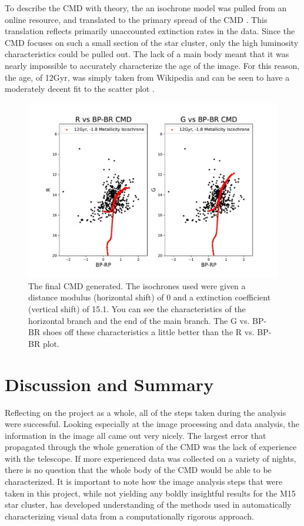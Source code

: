 \documentclass[twoside,11pt]{article}
\begin{document}
To describe the CMD with theory, the an isochrone model was pulled from an online resource, and translated to the primary spread of the CMD \citep{iso}. This translation reflects primarily unaccounted extinction rates in the data. Since the CMD focuses on such a small section of the star cluster, only the high luminosity characteristics could be pulled out. The lack of a main body meant that it was nearly impossible to accurately characterize the age of the image. For this reason, the age, of 12Gyr, was simply taken from Wikipedia and can be seen to have a moderately decent fit to the scatter plot \citep{wiki}. 

\begin{figure}[ht]
\includegraphics[width=\textwidth]{cmd.pdf}
\caption{The final CMD generated. The isochrones used were given a distance modulus (horizontal shift) of 0 and a extinction coefficient (vertical shift) of 15.1. You can see the characteristics of the horizontal branch and the end of the main branch. The G vs. BP-BR shoes off these characteristics a little better than the R vs. BP-BR plot.}
\label{fig:cmd}
\end{figure}

\section{Discussion and Summary}
Reflecting on the project as a whole, all of the steps taken during the analysis were successful. Looking especially at the image processing and data analysis, the information in the image all came out very nicely. The largest error that propagated through the whole generation of the CMD was the lack of experience with the telescope. If more experienced data was collected on a variety of nights, there is no question that the whole body of the CMD would be able to be characterized. It is important to note how the image analysis steps that were taken in this project, while not yielding any boldly insightful results for the M15 star cluster, has developed understanding of the methods used in automatically characterizing visual data from a computationally rigorous approach. 



\end{document}
